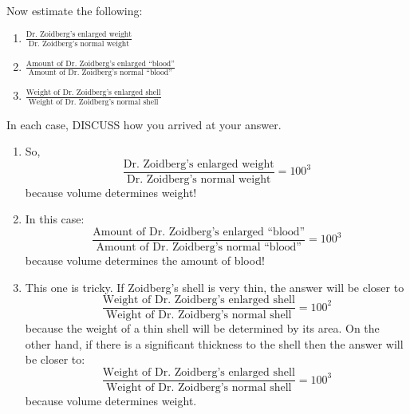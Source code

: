 \documentclass[handout,nooutcomes,noauthor]{ximera}
\begin{document}
\begin{question}
  Now estimate the following:
  \begin{enumerate}
    \item $\frac{\text{Dr.\ Zoidberg's enlarged
        weight}}{\text{Dr.\ Zoidberg's normal weight}}$
    \item $\frac{\text{Amount of Dr.\ Zoidberg's enlarged ``blood''}}{\text{Amount of Dr.\ Zoidberg's normal ``blood''}}$
    \item $\frac{\text{Weight of Dr.\ Zoidberg's enlarged
        shell}}{\text{Weight of Dr.\ Zoidberg's normal shell}}$
  \end{enumerate}
  In each case, DISCUSS how you arrived at your answer.
  \begin{freeResponse}
    \begin{enumerate}
    \item So,
      \[
      \frac{\text{Dr.\ Zoidberg's enlarged
        weight}}{\text{Dr.\ Zoidberg's normal weight}} = 100^3
      \]
      because volume determines weight!
    \item In this case:
      \[
      \frac{\text{Amount of Dr.\ Zoidberg's enlarged ``blood''}}{\text{Amount of Dr.\ Zoidberg's normal ``blood''}} = 100^3
      \]
      because volume determines the amount of blood!
    \item This one is tricky. If Zoidberg's shell is very thin, the answer will be closer to
      \[
      \frac{\text{Weight of Dr.\ Zoidberg's enlarged
          shell}}{\text{Weight of Dr.\ Zoidberg's normal shell}} = 100^2
      \]
      because the weight of a thin shell will be determined by its
      area. On the other hand, if there is a significant thickness to the shell then  the answer will be closer to:
      \[
      \frac{\text{Weight of Dr.\ Zoidberg's enlarged
          shell}}{\text{Weight of Dr.\ Zoidberg's normal shell}} = 100^3
      \]
      because volume determines weight.
    \end{enumerate}
  \end{freeResponse}
\end{question}
\mynewpage
\end{document}

